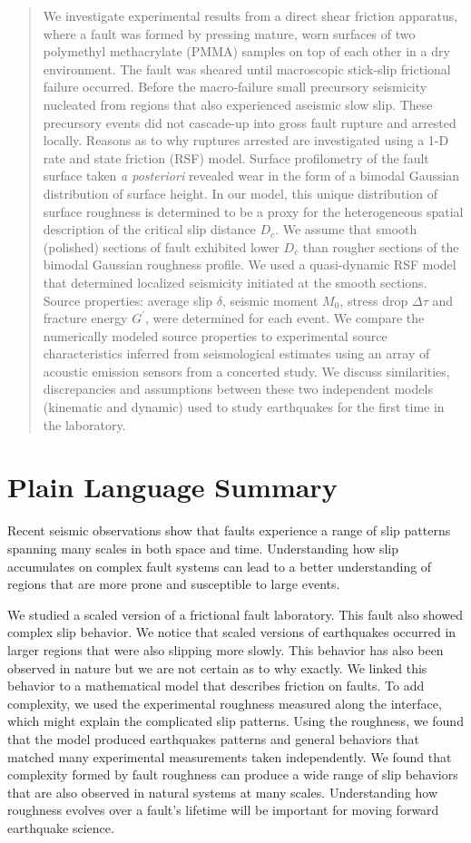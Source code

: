 \documentclass[draft]{agujournal2019}
\begin{document}
\begin{abstract}
We investigate experimental results from a direct shear friction apparatus, where a fault was formed by pressing mature, worn surfaces of two polymethyl methacrylate (PMMA) samples on top of each other in a dry environment. The fault was sheared until macroscopic stick-slip frictional failure occurred. Before the macro-failure small precursory seismicity nucleated from regions that also experienced aseismic slow slip. These precursory events did not cascade-up into gross fault rupture and arrested locally. Reasons as to why ruptures arrested are investigated using a 1-D rate and state friction (RSF) model. Surface profilometry of the fault surface taken \textit{a posteriori} revealed wear in the form of a bimodal Gaussian distribution of surface height. In our model, this unique distribution of surface roughness is determined to be a proxy for the heterogeneous spatial description of the critical slip distance $D_{c}$. We assume that smooth (polished) sections of fault exhibited lower $D_{c}$ than rougher sections of the bimodal Gaussian roughness profile.  We used a quasi-dynamic RSF model that determined localized seismicity initiated at the smooth sections. Source properties: average slip $\delta$, seismic moment $M_{0}$, stress drop $\Delta \tau$ and fracture energy $G^{'}$, were determined for each event. We compare the numerically modeled source properties to experimental source characteristics inferred from seismological estimates using an array of acoustic emission sensors from a concerted study. We discuss similarities, discrepancies and assumptions between these two independent models (kinematic and dynamic) used to study earthquakes for the first time in the laboratory.
\end{abstract}

\section*{Plain Language Summary}
Recent seismic observations show that faults experience a range of slip patterns spanning many scales in both space and time. Understanding how slip accumulates on complex fault systems can lead to a better understanding of regions that are more prone and susceptible to large events.

We studied a scaled version of a frictional fault laboratory. This fault also showed complex slip behavior. We notice that scaled versions of earthquakes occurred in larger regions that were also slipping more slowly. This behavior has also been observed in nature but we are not certain as to why exactly. We linked this behavior to a mathematical model that describes friction on faults. To add complexity, we used the experimental roughness measured along the interface, which might explain the complicated slip patterns. Using the roughness, we found that the model produced earthquakes patterns and general behaviors that matched many experimental measurements taken independently. We found that complexity formed by fault roughness can produce a wide range of slip behaviors that are also observed in natural systems at many scales. Understanding how roughness evolves over a fault's lifetime will be important for moving forward earthquake science.  
\end{document}
